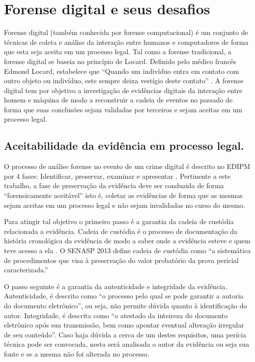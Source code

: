 \section{Forense digital e seus desafios}
\label{sec:forensedigital}

Forense digital (também conhecida por forense computacional) é um conjunto de técnicas de coleta e análise da interação entre humanos e computadores de forma que esta seja aceita em um processo legal.
%
Tal como a forense tradicional, a forense digital se baseia no princípio de Locard. Definido pelo médico francês Edmond Locard, estabelece que ``Quando um indivíduo entra em contato com outro objeto ou indivíduo, este sempre deixa vestígio deste contato'' \cite{Ramos:2011}.
%
A forense digital tem por objetivo a investigação de evidências digitais da interação entre homem e máquina de modo a reconstruir a cadeia de eventos no passado de forma que suas conclusões sejam validadas por terceiros e sejam aceitas em um processo legal.


\subsection{Aceitabilidade da evidência em processo legal.}
\label{sec:credibilidadeaceitabilidadeevidencia}

O processo de análise forense no evento de um crime digital é descrito no EDIPM por 4 fases: Identificar, preservar, examinar e apresentar \cite{GrisposChallengesCloudComputing:2012}.
%
Pertinente a este trabalho, a fase de preservação da evidência deve ser conduzida de forma ``forensicamente aceitável'' isto é, coletar as evidências de forma que as mesmas sejam aceitas em um processo legal e não sejam invalidadas no curso do mesmo.
%

Para atingir tal objetivo o primeiro passo é a garantia da cadeia de custódia relacionada a evidência.
%
Cadeia de custódia é o processo de documentação da história cronológica da evidência de modo a saber onde a evidência esteve e quem teve acesso a ela \cite{Ramos:2011}. O SENASP 2013 define cadeia de custódia como ``a sistemática de procedimentos que visa à preservação do valor probatório da prova pericial caracterizada.''
%

O passo seguinte é a garantia da autenticidade e integridade da evidência.
%
Autenticidade, é descrito como ``o processo pelo qual se pode garantir a autoria do documento eletrônico'', ou seja, não permite dúvida quanto à identificação do autor.
%
Integridade, é descrita como ``o atestado da inteireza do documento eletrônico após sua transmissão, bem como apontar eventual alteração irregular de seu conteúdo''. \cite{Ramos:2011}
%
Caso haja dúvida a cerca de um destes requisitos, uma perícia técnica pode ser convocada, nesta será analisada o autor da evidência ou seja sua fonte e se a mesma não foi alterada no processo.


